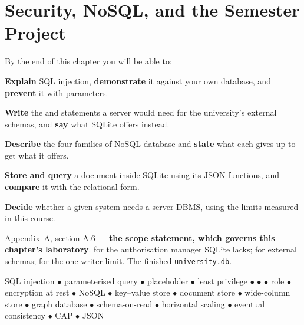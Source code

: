 \chapter{Security, NoSQL, and the Semester Project}\label{ch:project}

\begin{outcomes}
By the end of this chapter you will be able to:
\begin{tight}
  \item \textbf{Explain} SQL injection, \textbf{demonstrate} it against your
        own database, and \textbf{prevent} it with parameters.
  \item \textbf{Write} the  and  statements a server
        would need for the university's external schemas, and \textbf{say} what
        SQLite offers instead.
  \item \textbf{Describe} the four families of NoSQL database and
        \textbf{state} what each gives up to get what it offers.
  \item \textbf{Store and query} a document inside SQLite using its JSON
        functions, and \textbf{compare} it with the relational form.
  \item \textbf{Decide} whether a given system needs a server DBMS, using the
        limits measured in this course.
\end{tight}
\end{outcomes}

\begin{prereq}
Appendix~A, section A.6 --- \textbf{the scope statement, which governs this
chapter's laboratory}.  for the authorisation manager SQLite
lacks;  for external schemas;  for the
one-writer limit. The finished \texttt{university.db}.
\end{prereq}

\begin{keyterms}
SQL injection $\bullet$ parameterised query $\bullet$ placeholder $\bullet$
least privilege $\bullet$  $\bullet$  $\bullet$
role $\bullet$ encryption at rest $\bullet$ NoSQL $\bullet$ key--value store
$\bullet$ document store $\bullet$ wide-column store $\bullet$ graph database
$\bullet$ schema-on-read $\bullet$ horizontal scaling $\bullet$ eventual
consistency $\bullet$ CAP $\bullet$ JSON
\end{keyterms}

